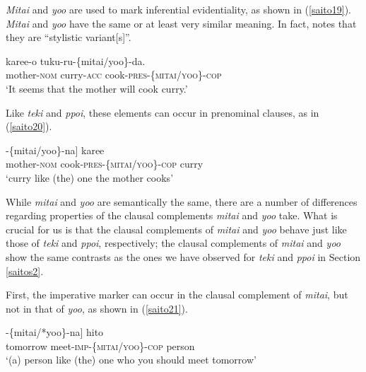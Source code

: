 \documentclass[output=paper]{langscibook}
\begin{document}
\emph{Mitai} and \emph{yoo} are used to mark inferential evidentiality, as shown in (\ref{saito19}). \emph{Mitai} and \emph{yoo} have the same or at least very similar meaning. In fact, \citet[169]{Narrog2009} notes that they are “stylistic variant[s]”.

\begin{exe}
\ex \label{saito19}
  {karee-o} {tuku-ru-}\{{mitai/yoo}\}-{da.}\\
mother-\textsc{nom} curry-\textsc{acc} cook-\textsc{pres}-\{\textsc{mitai/yoo}\}-\textsc{cop}\\ 
\glt ‘It seems that the mother will cook curry.’
\end{exe}

Like \emph{teki} and \emph{ppoi}, these elements can occur in prenominal clauses, as in (\ref{saito20}).

\begin{exe}
\ex \label{saito20}
\gll [[{okaasan-ga} {tuku-ru}]-\{{mitai/yoo}\}-{na}] {karee}\\
mother-\textsc{nom}  cook-\textsc{pres}-\{\textsc{mitai/yoo}\}-\textsc{cop} curry\\ 
\glt ‘curry like (the) one the mother cooks’
\end{exe}

While \emph{mitai} and \emph{yoo} are semantically the same, there are a number of differences regarding properties of the clausal complements \emph{mitai} and \emph{yoo} take. What is crucial for us is that the clausal complements of \emph{mitai} and \emph{yoo} behave just like those of \emph{teki} and \emph{ppoi}, respectively; the clausal complements of \emph{mitai} and \emph{yoo} show the same contrasts as the ones we have observed for \emph{teki} and \emph{ppoi} in Section \ref{saitos2}.

First, the imperative marker can occur in the clausal complement of \emph{mitai}, but not in that of \emph{yoo}, as shown in (\ref{saito21}).

\begin{exe}
\ex \label{saito21}
\gll [[{asita} {a-e}]-\{{mitai/*yoo}\}-{na}] {hito}\\
tomorrow meet-\textsc{imp}-\{\textsc{mitai/yoo}\}-\textsc{cop} person\\ 
\glt ‘(a) person like (the) one who you should meet tomorrow’
\end{exe}
\end{document}
